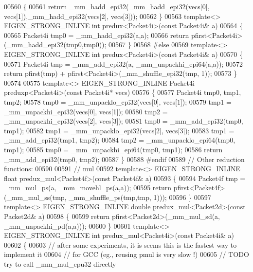 \begin{DoxyCode}
00560 \{
00561   \textcolor{keywordflow}{return} \_mm\_hadd\_epi32(\_mm\_hadd\_epi32(vecs[0], vecs[1]),\_mm\_hadd\_epi32(vecs[2], vecs[3]));
00562 \}
00563 \textcolor{keyword}{template}<> EIGEN\_STRONG\_INLINE \textcolor{keywordtype}{int} predux<Packet4i>(\textcolor{keyword}{const} Packet4i& a)
00564 \{
00565   Packet4i tmp0 = \_mm\_hadd\_epi32(a,a);
00566   \textcolor{keywordflow}{return} pfirst<Packet4i>(\_mm\_hadd\_epi32(tmp0,tmp0));
00567 \}
00568 \textcolor{preprocessor}{#else}
00569 \textcolor{keyword}{template}<> EIGEN\_STRONG\_INLINE \textcolor{keywordtype}{int} predux<Packet4i>(\textcolor{keyword}{const} Packet4i& a)
00570 \{
00571   Packet4i tmp = \_mm\_add\_epi32(a, \_mm\_unpackhi\_epi64(a,a));
00572   \textcolor{keywordflow}{return} pfirst(tmp) + pfirst<Packet4i>(\_mm\_shuffle\_epi32(tmp, 1));
00573 \}
00574 
00575 \textcolor{keyword}{template}<> EIGEN\_STRONG\_INLINE Packet4i preduxp<Packet4i>(\textcolor{keyword}{const} Packet4i* vecs)
00576 \{
00577   Packet4i tmp0, tmp1, tmp2;
00578   tmp0 = \_mm\_unpacklo\_epi32(vecs[0], vecs[1]);
00579   tmp1 = \_mm\_unpackhi\_epi32(vecs[0], vecs[1]);
00580   tmp2 = \_mm\_unpackhi\_epi32(vecs[2], vecs[3]);
00581   tmp0 = \_mm\_add\_epi32(tmp0, tmp1);
00582   tmp1 = \_mm\_unpacklo\_epi32(vecs[2], vecs[3]);
00583   tmp1 = \_mm\_add\_epi32(tmp1, tmp2);
00584   tmp2 = \_mm\_unpacklo\_epi64(tmp0, tmp1);
00585   tmp0 = \_mm\_unpackhi\_epi64(tmp0, tmp1);
00586   \textcolor{keywordflow}{return} \_mm\_add\_epi32(tmp0, tmp2);
00587 \}
00588 \textcolor{preprocessor}{#endif}
00589 \textcolor{comment}{// Other reduction functions:}
00590 
00591 \textcolor{comment}{// mul}
00592 \textcolor{keyword}{template}<> EIGEN\_STRONG\_INLINE \textcolor{keywordtype}{float} predux\_mul<Packet4f>(\textcolor{keyword}{const} Packet4f& a)
00593 \{
00594   Packet4f tmp = \_mm\_mul\_ps(a, \_mm\_movehl\_ps(a,a));
00595   \textcolor{keywordflow}{return} pfirst<Packet4f>(\_mm\_mul\_ss(tmp, \_mm\_shuffle\_ps(tmp,tmp, 1)));
00596 \}
00597 \textcolor{keyword}{template}<> EIGEN\_STRONG\_INLINE \textcolor{keywordtype}{double} predux\_mul<Packet2d>(\textcolor{keyword}{const} Packet2d& a)
00598 \{
00599   \textcolor{keywordflow}{return} pfirst<Packet2d>(\_mm\_mul\_sd(a, \_mm\_unpackhi\_pd(a,a)));
00600 \}
00601 \textcolor{keyword}{template}<> EIGEN\_STRONG\_INLINE \textcolor{keywordtype}{int} predux\_mul<Packet4i>(\textcolor{keyword}{const} Packet4i& a)
00602 \{
00603   \textcolor{comment}{// after some experiments, it is seems this is the fastest way to implement it}
00604   \textcolor{comment}{// for GCC (eg., reusing pmul is very slow !)}
00605   \textcolor{comment}{// TODO try to call \_mm\_mul\_epu32 directly}

\end{DoxyCode}
